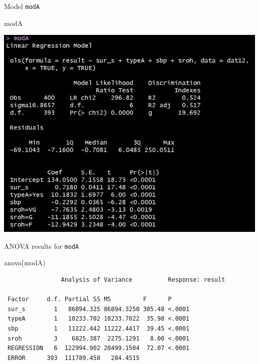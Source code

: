 \documentclass[
  ignorenonframetext,
]{beamer}
\newenvironment{Shaded}{\begin{snugshade}}{\end{snugshade}}
\newcommand{\FunctionTok}[1]{\textcolor[rgb]{0.00,0.00,0.00}{#1}}
\newcommand{\NormalTok}[1]{#1}
\begin{document}
\begin{frame}[fragile]{Model \texttt{modA}}
\protect\hypertarget{model-moda}{}
\begin{Shaded}
\begin{Highlighting}[]
\NormalTok{modA}
\end{Highlighting}
\end{Shaded}

\begin{center}\includegraphics[width=11.24in,height=0.65\textheight]{figures/small1} \end{center}
\end{frame}

\begin{frame}[fragile]{ANOVA results for \texttt{modA}}
\protect\hypertarget{anova-results-for-moda}{}
\begin{Shaded}
\begin{Highlighting}[]
\FunctionTok{anova}\NormalTok{(modA)}
\end{Highlighting}
\end{Shaded}

\begin{verbatim}
                Analysis of Variance          Response: result 

 Factor     d.f. Partial SS MS         F      P     
 sur_s        1   86894.325 86894.3250 305.48 <.0001
 typeA        1   10233.702 10233.7022  35.98 <.0001
 sbp          1   11222.442 11222.4417  39.45 <.0001
 sroh         3    6825.387  2275.1291   8.00 <.0001
 REGRESSION   6  122994.902 20499.1504  72.07 <.0001
 ERROR      393  111789.458   284.4515              
\end{verbatim}
\end{frame}
\end{document}
